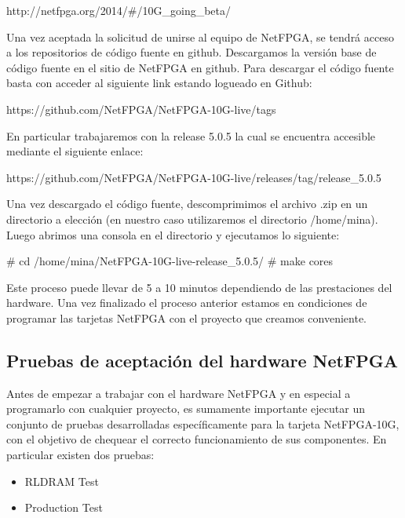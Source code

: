 \begin{center}
http://netfpga.org/2014/\#/10G\_going\_beta/
\end{center}

Una vez aceptada la solicitud de unirse al equipo de NetFPGA, se tendrá acceso a los repositorios de código fuente en github. Descargamos la versión base de código fuente en el sitio de NetFPGA en github. Para descargar el código fuente basta con acceder al siguiente link estando logueado en Github:

\begin{center}
https://github.com/NetFPGA/NetFPGA-10G-live/tags
\end{center}

En particular trabajaremos con la release 5.0.5 la cual se encuentra accesible mediante el siguiente enlace:
 
\begin{center}
https://github.com/NetFPGA/NetFPGA-10G-live/releases/tag/release\_5.0.5
\end{center}

Una vez descargado el código fuente, descomprimimos el archivo .zip en un directorio a elección (en nuestro caso utilizaremos el directorio /home/mina). Luego abrimos una consola en el directorio y ejecutamos lo siguiente:

\begin{bash}
# cd /home/mina/NetFPGA-10G-live-release_5.0.5/
# make cores
\end{bash}

Este proceso puede llevar de 5 a 10 minutos dependiendo de las prestaciones del hardware. Una vez finalizado el proceso anterior estamos en condiciones de programar las tarjetas NetFPGA con el proyecto que creamos conveniente.

\subsection{Pruebas de aceptación del hardware NetFPGA}
Antes de empezar a trabajar con el hardware NetFPGA y en especial a programarlo con cualquier proyecto, es sumamente importante ejecutar un conjunto de pruebas desarrolladas específicamente para la tarjeta NetFPGA-10G, con el objetivo de chequear el correcto funcionamiento de sus componentes. En particular existen dos pruebas:

\begin{itemize}
\item RLDRAM Test\citep{NetFPGA5}
\item Production Test\citep{NetFPGA7}
\end{itemize}

